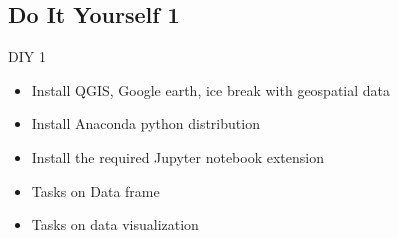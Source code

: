 \subsection[Do It Yourself 1]{Do It Yourself 1}
\begin{frame}{DIY 1}
	\begin{beamerboxesrounded}{}
		\begin{itemize}
			\item Install QGIS, Google earth, ice break with geospatial data
			\item Install Anaconda python distribution 
			\item Install the required Jupyter notebook extension
			\item Tasks on Data frame
			\item Tasks on data visualization
		\end{itemize}
	\end{beamerboxesrounded}
\end{frame}

